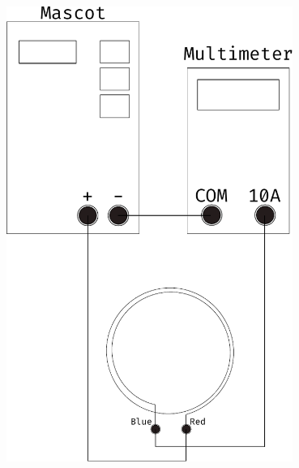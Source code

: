\documentclass[../Elmag-labhefte-2020.tex]{subfiles}
\begin{document}
\begin{itemize}
\begin{marginfigure}
        \includegraphics[width=0.7\textwidth]{fig/circuit_single_coil}
            
            

\end{marginfigure}
\end{itemize}
\end{document}
